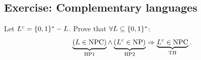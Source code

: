 \subsection{Exercise: Complementary languages}
Let $L^c=\{0,1\}^*-L$. Prove that $\forall L\subseteq\{0,1\}^*$:
\[\underbrace{(L\in\mathrm{NPC})}_{\mathrm{HP1}}\land
\underbrace{(L^c\in\mathrm{NP})}_{\mathrm{HP2}}\Rightarrow
\underbrace{L^c\in\mathrm{NPC}}_{\mathrm{TH}}.\]
